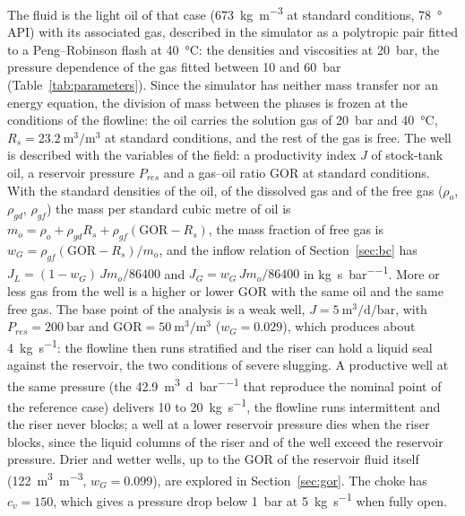 \documentclass[a4paper,fleqn]{cas-sc}
\begin{document}
The fluid is the light oil of that case (\SI{673}{\kilogram\per\cubic\metre} at standard conditions, \SI{78}{\degree} API) with its associated gas, described in the simulator as a polytropic pair fitted to a Peng--Robinson flash at \SI{40}{\celsius}: the densities and viscosities at \SI{20}{\bar}, the pressure dependence of the gas fitted between 10 and \SI{60}{\bar} (Table~\ref{tab:parameters}). Since the simulator has neither mass transfer nor an energy equation, the division of mass between the phases is frozen at the conditions of the flowline: the oil carries the solution gas of \SI{20}{\bar} and \SI{40}{\celsius}, $R_s = \SI{23.2}{\cubic\metre\per\cubic\metre}$ at standard conditions, and the rest of the gas is free. The well is described with the variables of the field: a productivity index $J$ of stock-tank oil, a reservoir pressure $P_{res}$ and a gas--oil ratio $\mathrm{GOR}$ at standard conditions. With the standard densities of the oil, of the dissolved gas and of the free gas ($\rho_{o}$, $\rho_{gd}$, $\rho_{gf}$) the mass per standard cubic metre of oil is $m_o = \rho_o + \rho_{gd} R_s + \rho_{gf}(\mathrm{GOR} - R_s)$, the mass fraction of free gas is $w_G = \rho_{gf}(\mathrm{GOR} - R_s)/m_o$, and the inflow relation of Section~\ref{sec:bc} has $J_L = (1 - w_G)\,J m_o/86400$ and $J_G = w_G\,J m_o/86400$ in \si{\kilogram\per\second\per\bar}. More or less gas from the well is a higher or lower GOR with the same oil and the same free gas. The base point of the analysis is a weak well, $J = \SI{5}{\cubic\metre\per\day\per\bar}$, with $P_{res} = \SI{200}{\bar}$ and $\mathrm{GOR} = \SI{50}{\cubic\metre\per\cubic\metre}$ ($w_G = 0.029$), which produces about \SI{4}{\kilogram\per\second}: the flowline then runs stratified and the riser can hold a liquid seal against the reservoir, the two conditions of severe slugging. A productive well at the same pressure (the \SI{42.9}{\cubic\metre\per\day\per\bar} that reproduce the nominal point of the reference case) delivers 10 to \SI{20}{\kilogram\per\second}, the flowline runs intermittent and the riser never blocks; a well at a lower reservoir pressure dies when the riser blocks, since the liquid columns of the riser and of the well exceed the reservoir pressure. Drier and wetter wells, up to the GOR of the reservoir fluid itself (\SI{122}{\cubic\metre\per\cubic\metre}, $w_G = 0.099$), are explored in Section~\ref{sec:gor}. The choke has $c_v = 150$, which gives a pressure drop below \SI{1}{\bar} at \SI{5}{\kilogram\per\second} when fully open.
\end{document}
